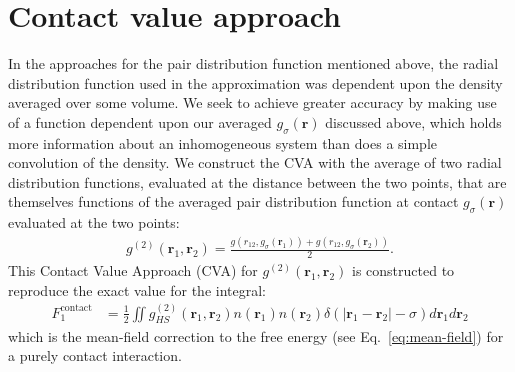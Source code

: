 \documentclass[letterpaper,twocolumn,amsmath,amssymb,pre,aps,10pt]{revtex4-1}
\newcommand{\cyan}[1]{{\bf \color{cyan} #1}}
\newcommand{\rr}{\textbf{r}}
\newcommand{\jeffsays}[1]{{\color{red} [\cyan{Jeff:} \emph{#1}]}}
\begin{document}



\section{Contact value approach}
In the approaches for the pair distribution function
mentioned above, the radial distribution function used in the
approximation was dependent upon the density averaged over some
volume.  We seek to achieve greater accuracy by making use of a
function dependent upon our averaged $g_{\sigma}(\rr)$ discussed
above, which holds more information about an inhomogeneous system than
does a simple convolution of the density.
%
We construct the CVA with the average of two radial distribution
functions, evaluated at the distance between the two points, that are
themselves functions of the averaged pair distribution function at contact
$g_{\sigma}(\rr)$ evaluated at the two points:
%
\begin{align}
  g^{(2)}(\rr_1,\rr_2) = \frac{g(r_{12}, g_\sigma(\rr_1)) +
    g(r_{12}, g_\sigma(\rr_2))}{2}. \label{eq:g2-our-mean}
\end{align}
This Contact Value Approach (CVA) for $g^{(2)}(\rr_1,\rr_2)$ is
constructed to reproduce the exact value for the integral:
\begin{align}
  F_1^{\text{contact}} &= \tfrac12 \iint
  g^{(2)}_{HS}(\rr_1,\rr_2)n(\rr_1)n(\rr_2)\delta(|\rr_1-\rr_2|-\sigma)
  d\rr_1d\rr_2
  \label{eq:mean-field-contact}
\end{align}
which is the mean-field correction to the free energy (see
Eq.~\ref{eq:mean-field}) for a purely contact interaction.
\end{document}
